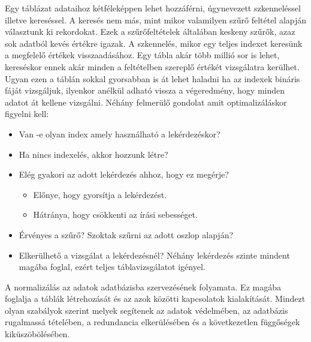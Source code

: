 

Egy táblázat adataihoz kétféleképpen lehet hozzáférni, úgynevezett szkenneléssel illetve kereséssel. A keresés nem más, mint mikor valamilyen szűrő feltétel alapján választunk ki rekordokat. Ezek a szűrőfeltételek általában keskeny szűrők, azaz sok adatból kevés értékre igazak. A szkennelés, mikor egy teljes indexet keresünk a megfelelő értékek visszaadásához. Egy tábla akár több millió sor is lehet, kereséskor ennek akár minden a feltételben szereplő értékét vizsgálatra kerülhet. Ugyan ezen a táblán sokkal gyorsabban is át lehet haladni ha az indexek bináris fáját vizsgáljuk, ilyenkor anélkül adható vissza a végeredmény, hogy minden adatot át kellene vizsgálni.
Néhány felmerülő gondolat amit optimalizáláskor figyelni kell:
\begin{itemize}
\item Van -e olyan index amely használható a lekérdezéskor?
\item Ha nincs indexelés, akkor hozzunk létre?
\item Elég gyakori az adott lekérdezés ahhoz, hogy ez megérje?
\begin{itemize}
\item Előnye, hogy gyorsítja a lekérdezést.
\item Hátránya, hogy csökkenti az írási sebességet.
\end{itemize}
\item Érvényes a szűrő? Szoktak szűrni az adott oszlop alapján?
\item Elkerülhető a vizsgálat a lekérdezésnél? Néhány lekérdezés szinte mindent magába foglal, ezért teljes táblavizsgálatot igényel.
\end{itemize}






A normalizálás az adatok adatbázisba szervezésének folyamata. Ez magába foglalja a táblák létrehozását és az azok közötti kapcsolatok kialakítását. Mindezt olyan szabályok szerint melyek segítenek az adatok védelmében, az adatbázis rugalmassá tételében, a redundancia elkerülésében és a következetlen függőségek kiküszöbölésében.

